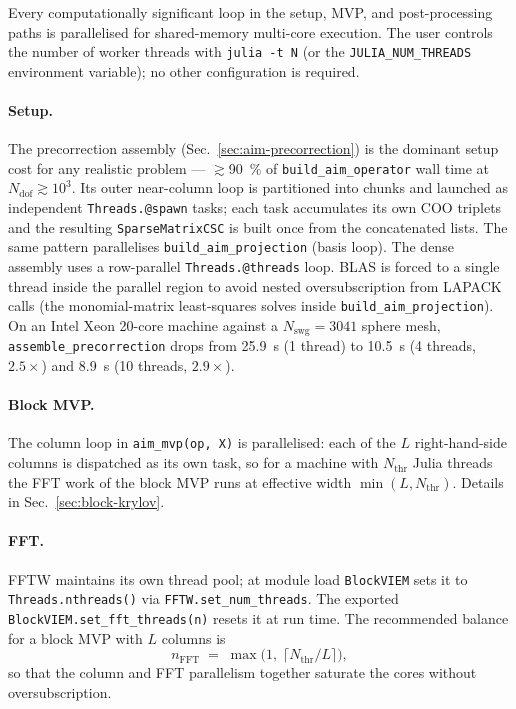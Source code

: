 \documentclass[11pt,a4paper]{article}
\begin{document}
Every computationally significant loop in the setup, MVP, and
post-processing paths is parallelised for shared-memory multi-core
execution. The user controls the number of worker threads with
\texttt{julia -t N} (or the \texttt{JULIA\_NUM\_THREADS} environment
variable); no other configuration is required.

\paragraph{Setup.}
The precorrection assembly (Sec.~\ref{sec:aim-precorrection}) is the
dominant setup cost for any realistic problem ---
$\gtrsim$\SI{90}{\percent} of \texttt{build\_aim\_operator} wall time
at $N_{\text{dof}}\gtrsim 10^3$. Its outer near-column loop is
partitioned into chunks and launched as independent
\texttt{Threads.@spawn} tasks; each task accumulates its own COO
triplets and the resulting \texttt{SparseMatrixCSC} is built once
from the concatenated lists. The same pattern parallelises
\texttt{build\_aim\_projection} (basis loop). The dense assembly uses a
row-parallel \texttt{Threads.@threads} loop. BLAS is forced to a
single thread inside the parallel region to avoid nested
oversubscription from LAPACK calls (the monomial-matrix
least-squares solves inside \texttt{build\_aim\_projection}). On an
Intel Xeon 20-core machine against a $N_{\text{swg}}\!=\!3041$
sphere mesh, \texttt{assemble\_precorrection} drops from
\SI{25.9}{\second} (1 thread) to \SI{10.5}{\second} (4 threads,
$2.5\times$) and \SI{8.9}{\second} (10 threads, $2.9\times$).

\paragraph{Block MVP.}
The column loop in \texttt{aim\_mvp(op, X)} is parallelised: each of
the $L$ right-hand-side columns is dispatched as its own task, so
for a machine with $N_{\text{thr}}$ Julia threads the FFT work of
the block MVP runs at effective width
$\min(L,N_{\text{thr}})$. Details in
Sec.~\ref{sec:block-krylov}.

\paragraph{FFT.}
FFTW maintains its own thread pool; at module load
\texttt{BlockVIEM} sets it to \texttt{Threads.nthreads()} via
\texttt{FFTW.set\_num\_threads}. The exported
\texttt{BlockVIEM.set\_fft\_threads(n)} resets it at run time. The
recommended balance for a block MVP with $L$ columns is
\begin{equation}
  n_{\text{FFT}} \;=\;
    \max\!\bigl(1,\;\lceil N_{\text{thr}} / L\rceil\bigr),
  \label{eq:fft-threads-rule}
\end{equation}
so that the column and FFT parallelism together saturate the cores
without oversubscription.
\end{document}
